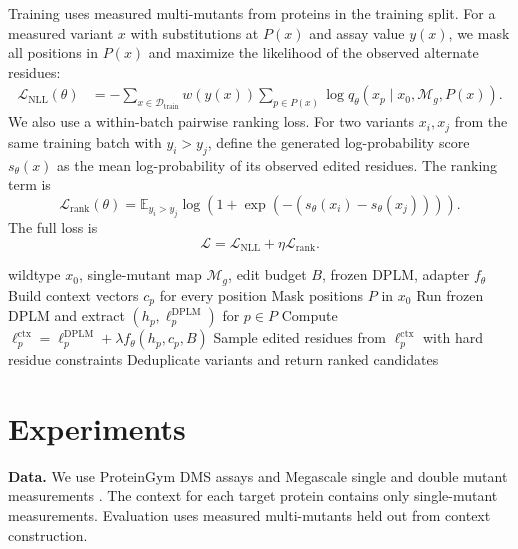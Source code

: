 \documentclass{article}
\newcommand{\D}{\mathcal{D}}
\newcommand{\M}{\mathcal{M}}
\newcommand{\E}{\mathbb{E}}
\newcommand{\1}{\mathbf{1}}
\begin{document}
Training uses measured multi-mutants from proteins in the training split. For a measured variant $x$ with substitutions at $P(x)$ and assay value $y(x)$, we mask all positions in $P(x)$ and maximize the likelihood of the observed alternate residues:
\begin{align}
  \mathcal{L}_{\mathrm{NLL}}(\theta)
  &=
  - \sum_{x \in \D_{\mathrm{train}}}
  w(y(x))
  \sum_{p \in P(x)}
  \log q_\theta\!\left(
    x_p \mid x_0, \M_g, P(x)
  \right).
\end{align}
We also use a within-batch pairwise ranking loss. For two variants $x_i,x_j$ from the same training batch with $y_i > y_j$, define the generated log-probability score $s_\theta(x)$ as the mean log-probability of its observed edited residues. The ranking term is
\begin{equation}
  \mathcal{L}_{\mathrm{rank}}(\theta)
  =
  \E_{y_i > y_j}
  \log(1 + \exp(-(s_\theta(x_i)-s_\theta(x_j)))).
\end{equation}
The full loss is
\begin{equation}
  \mathcal{L} = \mathcal{L}_{\mathrm{NLL}} + \eta \mathcal{L}_{\mathrm{rank}}.
\end{equation}

\begin{algorithm}[t]
\caption{DMS-Conditioned DPLM Generation}
\label{alg:context-generation}
\begin{algorithmic}
 wildtype $x_0$, single-mutant map $\M_g$, edit budget $B$, frozen DPLM, adapter $f_\theta$
\STATE Build context vectors $c_p$ for every position
  \STATE Mask positions $P$ in $x_0$
  \STATE Run frozen DPLM and extract $(h_p,\ell_p^{\mathrm{DPLM}})$ for $p \in P$
  \STATE Compute $\ell_p^{\mathrm{ctx}}=\ell_p^{\mathrm{DPLM}}+\lambda f_\theta(h_p,c_p,B)$
  \STATE Sample edited residues from $\ell_p^{\mathrm{ctx}}$ with hard residue constraints
\ENDFOR
\STATE Deduplicate variants and return ranked candidates
\end{algorithmic}
\end{algorithm}

\section{Experiments}

\textbf{Data.} We use ProteinGym DMS assays and Megascale single and double mutant measurements \cite{notin2024proteingym,tsuboyama2023mega}. The context for each target protein contains only single-mutant measurements. Evaluation uses measured multi-mutants held out from context construction.
\end{document}
